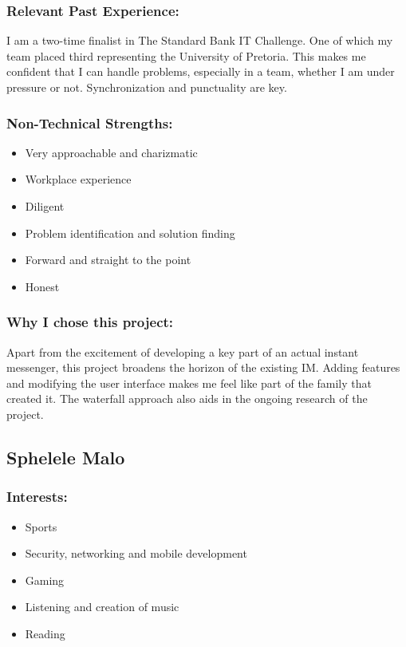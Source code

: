 \subsubsection{Relevant Past Experience:}
\par{I am a two-time finalist in The Standard Bank IT Challenge. One of which my team placed third representing the University of Pretoria. This makes me confident that I can handle problems, especially in a team, whether I am under pressure or not. Synchronization and punctuality are key.}

\subsubsection{Non-Technical Strengths:}
\begin{itemize}
	\item Very approachable and charizmatic
	\item Workplace experience
	\item Diligent
	\item Problem identification and solution finding
	\item Forward and straight to the point
	\item Honest
\end{itemize}

\subsubsection{Why I chose this project:}
\par{Apart from the excitement of developing a key part of an actual instant messenger, this project broadens the horizon of the existing IM. Adding features and modifying the user interface makes me feel like part of the family that created it. The waterfall approach also aids in the ongoing research of the project.}

\newpage
\subsection{Sphelele Malo}
\subsubsection{Interests:}
	\begin{itemize}
		\item Sports
		\item Security, networking and mobile development
		\item Gaming
		\item Listening and creation of music 
		\item Reading 
	\end{itemize}
